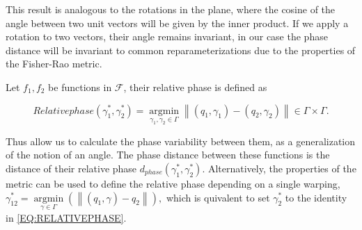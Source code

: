 This result is analogous to the rotations in the plane, where the cosine of
the angle between two unit vectors will be given by the inner product.
If we apply a rotation to two vectors, their angle remains invariant, in our
case the phase distance will be invariant to common reparameterizations due to
the properties of the Fisher-Rao metric.

Let $f_1, f_2$ be functions in $\mathcal{F}$, their relative phase is defined as

\begin{equation}[EQ:RELATIVEPHASE]{Relative phase}
\left(\gamma_{1}^{*}, \gamma_{2}^{*}\right)=\underset{\gamma_{1}, \gamma_{2} \in \Gamma}{\operatorname{argmin}}\left\|\left(q_{1}, \gamma_{1}\right)-\left(q_{2}, \gamma_{2}\right)\right\| \in \Gamma \times \Gamma.
\end{equation}

Thus allow us to calculate the phase variability between them,
as a generalization of the notion of an angle. The phase distance between these
functions is the distance of their relative phase
$d_{phase} (\gamma_{1}^{*}, \gamma_{2}^{*})$. Alternatively, the properties of
the metric can be used to define the relative phase depending on a single warping,
$
\gamma_{12}^{*}=\underset{\gamma \in \Gamma}{\operatorname{argmin}}\left(\left\|\left(q_{1}, \gamma \right)- q_{2}\right\|\right),
$
which is quivalent to set $\gamma_2^*$ to the identity in \ref{EQ:RELATIVEPHASE}.
